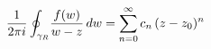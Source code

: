 \documentclass[preview]{standalone}
\begin{document}
\begin{align*}
\special{dvisvgm:raw <g id='unique000'>}\frac{1}{2\pi i}\oint_{\gamma_R}\!\frac{f(w)}{w-z}\,dw= \sum_{n=0}^{\infty} c_n\,(z-z_0)^n\special{dvisvgm:raw </g>}
\end{align*}
\end{document}

